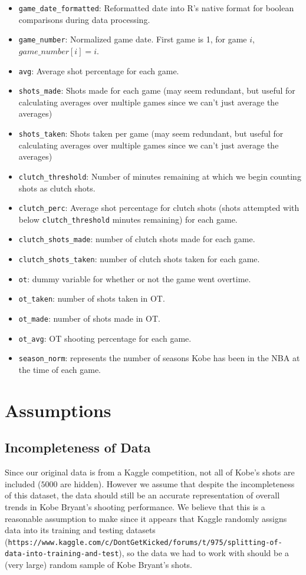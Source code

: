 \documentclass[paper=a4, fontsize=11pt]{scrartcl} %
\numberwithin{equation}{section} %
\numberwithin{figure}{section} %
\numberwithin{table}{section} %
\begin{document}
\begin{itemize}
	\item \texttt{game\_date\_formatted}: Reformatted date into R's native format for boolean comparisons during data processing. 
	\item \texttt{game\_number}: Normalized game date. First game is 1, for game $i$, $game\_number[i] = i$.
	\item \texttt{avg}: Average shot percentage for each game.
	\item \texttt{shots\_made}: Shots made for each game (may seem redundant, but useful for calculating averages over multiple games since we can't just average the averages)
	\item \texttt{shots\_taken}: Shots taken per game (may seem redundant, but useful for calculating averages over multiple games since we can't just average the averages)
	\item \texttt{clutch\_threshold}: Number of minutes remaining at which we begin counting shots as clutch shots.
	\item \texttt{clutch\_perc}: Average shot percentage for clutch shots (shots attempted with below \texttt{clutch\_threshold} minutes remaining) for each game.
	\item \texttt{clutch\_shots\_made}: number of clutch shots made for each game.
	\item \texttt{clutch\_shots\_taken}: number of clutch shots taken for each game. 
	\item \texttt{ot}: dummy variable for whether or not the game went overtime.
	\item \texttt{ot\_taken}: number of shots taken in OT.
	\item \texttt{ot\_made}: number of shots made in OT.
	\item \texttt{ot\_avg}: OT shooting percentage for each game.
	\item \texttt{season\_norm}: represents the number of seasons Kobe has been in the NBA at the time of each game.
	\end{itemize}
\section{Assumptions}
\subsection{Incompleteness of Data}
\hspace*{1cm}Since our original data is from a Kaggle competition, not all of Kobe's shots are included ($5000$ are hidden). However we assume that despite the incompleteness of this dataset, the data should still be an accurate representation of overall trends in Kobe Bryant's shooting performance. We believe that this is a reasonable assumption to make since it appears that Kaggle randomly assigns data into its training and testing datasets (\texttt{https://www.kaggle.com/c/DontGetKicked/forums/t/975/splitting-of-data-into-training-and-test}), so the data we had to work with should be a (very large) random sample of Kobe Bryant's shots.
\end{document}
